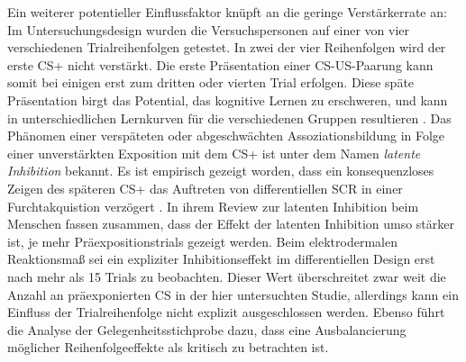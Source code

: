 	 
	Ein weiterer potentieller Einflussfaktor knüpft an die geringe Verstärkerrate an: Im Untersuchungsdesign wurden die Versuchspersonen auf einer von vier verschiedenen Trialreihenfolgen getestet. In zwei der vier Reihenfolgen wird der erste CS+ nicht verstärkt. Die erste Präsentation einer CS-US-Paarung kann somit bei einigen erst zum dritten oder vierten Trial erfolgen.	
	Diese späte Präsentation %
	birgt das Potential, das kognitive Lernen zu erschweren, und kann in unterschiedlichen Lernkurven für die verschiedenen Gruppen resultieren \parencite{LONSDORF2017fc}. Das Phänomen einer verspäteten oder abgeschwächten Assoziationsbildung in Folge einer unverstärkten Exposition mit dem CS+ ist unter dem Namen \textit{latente Inhibition} bekannt. Es ist empirisch gezeigt worden, dass ein konsequenzloses Zeigen des späteren CS+ das Auftreten von differentiellen SCR in einer Furchtakquistion verzögert \parencite[z.\,B.][]{SIDDLE1985}. In ihrem Review zur latenten Inhibition beim Menschen fassen \textcite{VAITL1997} zusammen, dass der Effekt der latenten Inhibition umso stärker ist, je mehr Präexpositionstrials gezeigt werden. Beim elektrodermalen Reaktionsmaß sei ein expliziter Inhibitionseffekt im differentiellen Design erst nach mehr als 15 Trials zu beobachten. Dieser Wert überschreitet zwar weit die Anzahl an präexponierten CS in der hier untersuchten Studie, allerdings kann ein Einfluss der Trialreihenfolge nicht explizit ausgeschlossen werden. Ebenso führt die Analyse der Gelegenheitsstichprobe dazu, dass eine Ausbalancierung möglicher Reihenfolgeeffekte als kritisch zu betrachten ist.  %
	
